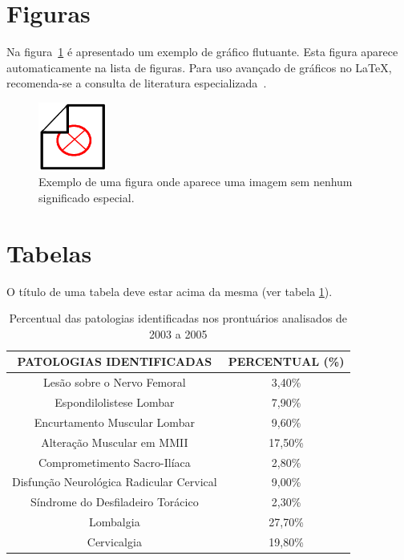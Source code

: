 \section{Figuras}

Na figura~\ref{fig:dummy} \'e apresentado um exemplo de gr\'afico flutuante. Esta figura aparece automaticamente na lista de figuras. Para uso avan\c{c}ado de gr\'aficos no \LaTeX, recomenda-se a consulta de literatura especializada~\cite{Goossens2007}.


\begin{figure}[!htb]
	\centering
	\includegraphics[width=0.2\textwidth]{./imagens/dummy.png} %
	\caption[Exemplo de uma figura]{Exemplo de uma figura onde aparece uma imagem sem nenhum significado especial.}
	\label{fig:dummy}
\end{figure}


\section{Tabelas}

O título de uma tabela deve estar acima da mesma (ver tabela \ref{tab:patologias}).

\begin{table}[htbp]
	\centering
	\caption{Percentual das patologias identificadas nos prontuários analisados de 2003 a 2005}
	\label{tab:patologias}
	\begin{tabular}{|c|c|}
		\hline
		PATOLOGIAS IDENTIFICADAS & PERCENTUAL (\%) \\ \hline
		Lesão sobre o Nervo Femoral & 3,40\% \\ \hline
		Espondilolistese Lombar & 7,90\% \\ \hline
		Encurtamento Muscular Lombar & 9,60\% \\ \hline
		Alteração Muscular em MMII & 17,50\% \\ \hline
		Comprometimento Sacro-Ilíaca & 2,80\% \\ \hline
		Disfunção Neurológica Radicular Cervical & 9,00\% \\ \hline
		Síndrome do Desfiladeiro Torácico & 2,30\% \\ \hline
		Lombalgia & 27,70\% \\ \hline
		Cervicalgia & 19,80\% \\ \hline
	\end{tabular}
\end{table}

